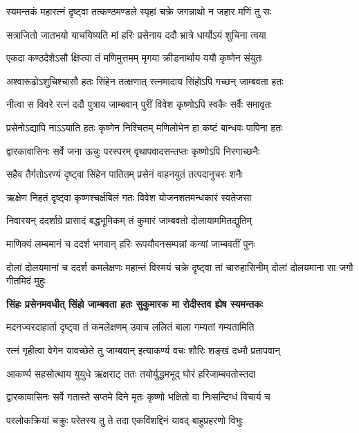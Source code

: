 \twolineshloka
{स्यमन्तकं महारत्नं दृष्ट्वा तत्कण्ठमण्डले}
{स्पृहां चक्रे जगन्नाथो न जहार मणिं तु सः}%

\twolineshloka
{सत्राजितो जातभयो याचयिष्यति मां हरिः}
{प्रसेनाय ददौ भ्रात्रे धार्योऽयं शुचिना त्वया}%

\twolineshloka
{एकदा कण्ठदेशेऽसौ क्षिप्त्वा तं मणिमुत्तमम्}
{मृगया क्रीडनार्थाय ययौ कृष्णेन संयुतः}%

\twolineshloka
{अश्वारूढोऽशुचिश्चासौ हतः सिंहेन तत्क्षणात्}
{रत्नमादाय सिंहोऽपि गच्छन् जाम्बवता हतः}%

\twolineshloka
{नीत्वा स विवरे रत्नं ददौ पुत्राय जाम्बवान्}
{पुरीं विवेश कृष्णोऽपि स्वकैः सर्वैः समावृतः}%

\twolineshloka
{प्रसेनोऽद्यापि नाऽऽयाति हतः कृष्णेन निश्चितम्}
{मणिलोभेन हा कष्टं बान्धवः पापिना हतः}%

\twolineshloka
{द्वारकावासिनः सर्वे जना ऊचुः परस्परम्}
{वृथापवादसन्तप्तः कृष्णोऽपि निरगाच्छनैः}%

\twolineshloka
{सहैव तैर्गतोऽरण्यं दृष्ट्वा सिंहेन पातितम्}
{प्रसेनं वाहनयुतं तत्पदानुचरः शनैः}%

\twolineshloka
{ऋक्षेण निहतं दृष्ट्वा कृष्णश्चर्क्षबिलं गतः}
{विवेश योजनशतमन्धकारं स्वतेजसा}%

\twolineshloka
{निवारयन् ददर्शाग्रे प्रासादं बद्धभूमिकम्}
{तं कुमारं जाम्बवतो दोलायाममितद्युतिम्}%

\twolineshloka
{माणिक्यं लम्बमानं च ददर्श भगवान् हरिः}
{रूपयौवनसम्पन्नां कन्यां जाम्बवतीं पुनः}%

\threelineshloka
{दोलां दोलयमानां च ददर्श कमलेक्षणः}
{महान्तं विस्मयं चक्रे दृष्ट्वा तां चारुहासिनीम्}
{दोलां दोलयमाना सा जगौ गीतमिदं मुहुः}%

\begingroup
\bfseries
\twolineshloka
{सिंहः प्रसेनमवधीत् सिंहो जाम्बवता हतः}
{सुकुमारक मा रोदीस्तव ह्येष स्यमन्तकः}%
\endgroup

\twolineshloka
{मदनज्वरदाहार्ता दृष्ट्वा तं कमलेक्षणम्}
{उवाच ललितं बाला गम्यतां गम्यतामिति}%

\twolineshloka
{रत्नं गृहीत्वा वेगेन यावच्छेते तु जाम्बवान्}
{इत्याकर्ण्य वचः शौरिः शङ्खं दध्मौ प्रतापवान्}%

\twolineshloka
{आकर्ण्य सहसोत्थाय युयुधे ऋक्षराट् ततः}
{तयोर्युद्धमभूद् घोरं हरिजाम्बवतोस्तदा}%

\twolineshloka
{द्वारकावासिनः सर्वे गतास्ते सप्तमे दिने}
{मृतः कृष्णो भक्षितो वा निःसन्दिग्धं विचार्य च}%

\twolineshloka
{परलोकक्रियां चक्रुः परेतस्य तु ते तदा}
{एकविंशद्दिनं यावद् बाहुप्रहरणो विभुः}%

